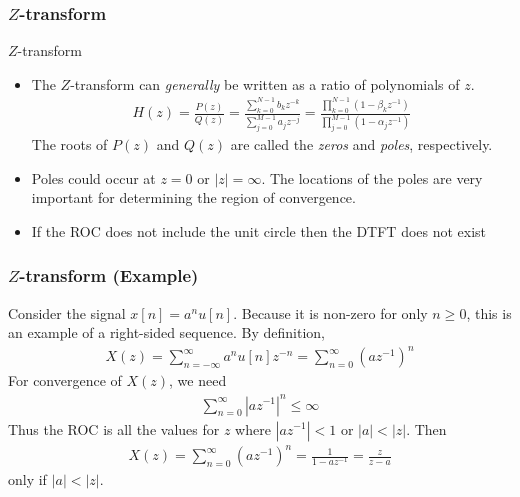 \documentclass[mathserif,9pt,handout]{beamer}
\begin{document}
\begin{frame}\frametitle{$Z$-transform}\small
  \begin{block}{$Z$-transform}
    \begin{itemize}
      \item The $Z$-transform can {\em\color{blue!50!black}generally} be written as a ratio of polynomials of $z$.
        \begin{align}
          H(z) =\frac{P(z)}{Q(z)} = \frac{\sum_{k=0}^{N-1} b_k z^{-k}}{\sum_{j=0}^{M-1}a_j z^{-j}} = \frac{\prod_{k=0}^{N-1}(1 - \beta_k z^{-1})}{\prod_{j=0}^{M-1}(1 - \alpha_j z^{-1})}
          \nonumber
        \end{align} 
        The roots of $P(z)$ and $Q(z)$ are called the {\em\color{blue!50!black}zeros} and {\em\color{blue!50!black}poles}, respectively. 
      \item Poles could occur at $z=0$ or $|z|=\infty$. The locations of the poles are very important for determining the region of convergence. 
      \item If the ROC does not include the unit circle then the DTFT does not exist
    \end{itemize}
  \end{block}
\end{frame}

\begin{frame}\frametitle{$Z$-transform (Example)}\small
  Consider the signal $x[n] = a^n u[n]$. Because it is non-zero for only $n \geq 0$, this is an example of a right-sided sequence. By definition, 
  \begin{align}
    X(z) = \sum_{n=-\infty}^{\infty} a^n u[n] z^{-n} = \sum_{n=0}^{\infty} (az^{-1})^n \nonumber
  \end{align}
  For convergence of $X(z)$, we need
  \begin{align}
     \sum_{n=0}^{\infty} |az^{-1}|^n  \leq \infty\nonumber
  \end{align}
  Thus the ROC is all the values for $z$ where $|az^{-1}| < 1$ or $|a| < |z|$.  Then 
  \begin{align}
    X(z)  = \sum_{n=0}^{\infty} (az^{-1})^n  = \frac{1}{1 - az^{-1}} = \frac{z}{z-a} \nonumber
  \end{align}
  only if $|a| < |z|$.
\end{frame}
\end{document}
